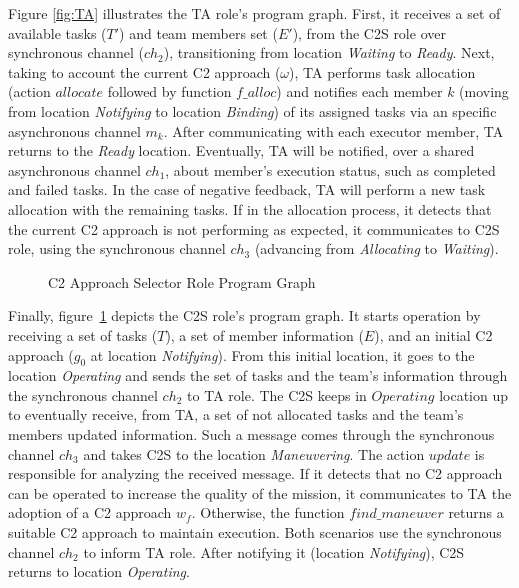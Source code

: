 Figure \ref{fig:TA} illustrates the TA role's program graph. First, it receives a set of available tasks ($T'$) and team members set ($E'$), from the C2S role over synchronous channel ($ch_2$), transitioning from location \textit{Waiting} to \textit{Ready}. Next, taking to account the current C2 approach ($\omega$), TA performs task allocation (action $allocate$ followed by function $f\_alloc$) and notifies each member $k$ (moving from location \textit{Notifying} to location \textit{Binding}) of its assigned tasks via an specific asynchronous channel $m_k$. After communicating with each executor member, TA returns to the \textit{Ready} location. Eventually, TA will be notified, over a shared asynchronous channel $ch_1$, about member's execution status, such as completed and failed tasks. In the case of negative feedback, TA will perform a new task allocation with the remaining tasks. If in the allocation process, it detects that the current C2 approach is not performing as expected, it communicates to C2S role, using the synchronous channel $ch_3$ (advancing from \textit{Allocating} to \textit{Waiting}).

\begin{figure}[!ht]
    \centering
    \scalebox{.65}{}
    \caption{C2 Approach Selector Role Program Graph}
    \label{fig:C2S}
\end{figure}

Finally, figure~\ref{fig:C2S} depicts the C2S role's program graph. It starts operation by receiving a set of tasks ($T$), a set of member information ($E$), and an initial C2 approach ($g_0$ at location \textit{Notifying}). From this initial location, it goes to the location \textit{Operating} and sends the set of tasks and the team's information through the synchronous channel $ch_2$ to TA role. The C2S keeps in $Operating$ location up to eventually receive, from TA, a set of not allocated tasks and the team's members updated information. Such a message comes through the synchronous channel $ch_3$ and takes C2S to the location \textit{Maneuvering}. The action $update$ is responsible for analyzing the received message. If it detects that no C2 approach can be operated to increase the quality of the mission, it communicates to TA the adoption of a C2 approach $w_f$. Otherwise, the function $find\_maneuver$ returns a suitable C2 approach to maintain execution. Both scenarios use the synchronous channel $ch_2$ to inform TA role. After notifying it (location \textit{Notifying}), C2S returns to location \textit{Operating}.

